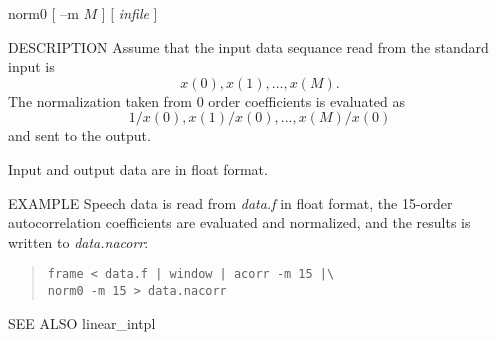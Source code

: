 
\begin{synopsis}
\item[norm0] [ --m $M$ ] [ {\em infile} ]
\end{synopsis}

\begin{qsection}{DESCRIPTION}
Assume that the input data sequance read from the standard input
is
\begin{displaymath}
x(0), x(1), \ldots, x(M).
\end{displaymath}
The normalization taken from 0 order coefficients is evaluated as
\begin{displaymath}
1/x(0), x(1)/x(0), \ldots, x(M)/x(0)
\end{displaymath}
and sent to the output.
\par
Input and output data are in float format.
\end{qsection}

\begin{options}
\end{options}

\begin{qsection}{EXAMPLE}
Speech data is read from {\em data.f} in float format,
the 15-order autocorrelation coefficients are evaluated
and normalized, and the results is written to {\em data.nacorr}:
\begin{quote}
  \verb!frame < data.f | window | acorr -m 15 |\ !\\
  \verb!norm0 -m 15 > data.nacorr!
\end{quote}
\end{qsection}

\begin{qsection}{SEE ALSO}
 linear\_intpl
\end{qsection}
